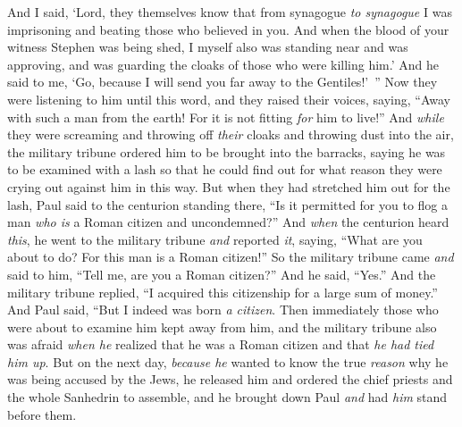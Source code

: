\begin{biblechapter}
\verse And I said, ‘Lord, they themselves know that from synagogue \textit{to synagogue} I was imprisoning and beating those who believed in you.
\verse And when the blood of your witness Stephen was being shed, I myself also was standing near and was approving, and was guarding the cloaks of those who were killing him.’
\verse And he said to me, ‘Go, because I will send you far away to the Gentiles!’ ”
 Now they were listening to him until this word, and they raised their voices, saying, “Away with such a man from the earth! For it is not fitting \textit{for} him to live!”
\verse And \textit{while} they were screaming and throwing off \textit{their} cloaks and throwing dust into the air,
\verse the military tribune ordered him to be brought into the barracks, saying he was to be examined with a lash so that he could find out for what reason they were crying out against him in this way.
\verse But when they had stretched him out for the lash, Paul said to the centurion standing there, “Is it permitted for you to flog a man \textit{who is} a Roman citizen and uncondemned?”
\verse And \textit{when} the centurion heard \textit{this}, he went to the military tribune \textit{and} reported \textit{it}, saying, “What are you about to do? For this man is a Roman citizen!”
\verse So the military tribune came \textit{and} said to him, “Tell me, are you a Roman citizen?” And he said, “Yes.”
\verse And the military tribune replied, “I acquired this citizenship for a large sum of money.” And Paul said, “But I indeed was born \textit{a citizen}.
\verse Then immediately those who were about to examine him kept away from him, and the military tribune also was afraid \textit{when he} realized that he was a Roman citizen and that \textit{he had tied him up}.
\verse But on the next day, \textit{because he} wanted to know the true \textit{reason} why he was being accused by the Jews, he released him and ordered the chief priests and the whole Sanhedrin to assemble, and he brought down Paul \textit{and} had \textit{him} stand before them.
\end{biblechapter}

